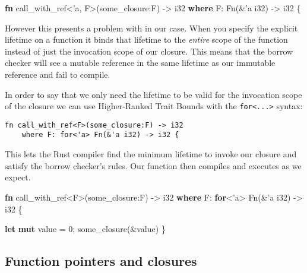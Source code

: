 \documentclass[a4paper,]{book}
\newenvironment{Shaded}{\begin{snugshade}}{\end{snugshade}}
\newcommand{\KeywordTok}[1]{\textcolor[rgb]{0.13,0.29,0.53}{\textbf{{#1}}}}
\newcommand{\DataTypeTok}[1]{\textcolor[rgb]{0.13,0.29,0.53}{{#1}}}
\newcommand{\DecValTok}[1]{\textcolor[rgb]{0.00,0.00,0.81}{{#1}}}
\newcommand{\OtherTok}[1]{\textcolor[rgb]{0.56,0.35,0.01}{{#1}}}
\newcommand{\BuiltInTok}[1]{{#1}}
\newcommand{\NormalTok}[1]{{#1}}
\begin{document}
\begin{Shaded}
\begin{Highlighting}[]
\KeywordTok{fn} \NormalTok{call_with_ref<}\OtherTok{'a}\NormalTok{, F>(some_closure:F) -> }\DataTypeTok{i32}
    \KeywordTok{where} \NormalTok{F: }\BuiltInTok{Fn}\NormalTok{(&}\OtherTok{'a} \DataTypeTok{i32}\NormalTok{) -> }\DataTypeTok{i32} \NormalTok{\{}
\end{Highlighting}
\end{Shaded}

However this presents a problem with in our case. When you specify the
explicit lifetime on a function it binds that lifetime to the
\emph{entire} scope of the function instead of just the invocation scope
of our closure. This means that the borrow checker will see a mutable
reference in the same lifetime as our immutable reference and fail to
compile.

In order to say that we only need the lifetime to be valid for the
invocation scope of the closure we can use Higher-Ranked Trait Bounds
with the \texttt{for\textless{}...\textgreater{}} syntax:

\begin{verbatim}
fn call_with_ref<F>(some_closure:F) -> i32
    where F: for<'a> Fn(&'a i32) -> i32 {
\end{verbatim}

This lets the Rust compiler find the minimum lifetime to invoke our
closure and satisfy the borrow checker's rules. Our function then
compiles and executes as we expect.

\begin{Shaded}
\begin{Highlighting}[]
\KeywordTok{fn} \NormalTok{call_with_ref<F>(some_closure:F) -> }\DataTypeTok{i32}
    \KeywordTok{where} \NormalTok{F: }\KeywordTok{for}\NormalTok{<}\OtherTok{'a}\NormalTok{> }\BuiltInTok{Fn}\NormalTok{(&}\OtherTok{'a} \DataTypeTok{i32}\NormalTok{) -> }\DataTypeTok{i32} \NormalTok{\{}

    \KeywordTok{let} \KeywordTok{mut} \NormalTok{value = }\DecValTok{0}\NormalTok{;}
    \NormalTok{some_closure(&value)}
\NormalTok{\}}
\end{Highlighting}
\end{Shaded}

\subsection{Function pointers and
closures}\label{function-pointers-and-closures}
\end{document}
